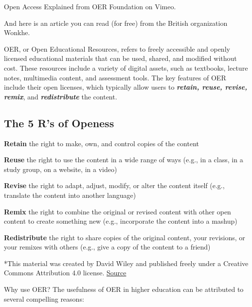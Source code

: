 \documentclass[
]{book}
\theoremstyle{definition}
\theoremstyle{definition}
\theoremstyle{definition}
\theoremstyle{definition}
\theoremstyle{remark}
\begin{document}
Open Access Explained from OER Foundation on Vimeo.

And here is an article you can read (for free) from the British organization Wonkhe.

OER, or Open Educational Resources, refers to freely accessible and openly licensed educational materials that can be used, shared, and modified without cost. These resources include a variety of digital assets, such as textbooks, lecture notes, multimedia content, and assessment tools. The key features of OER include their open licenses, which typically allow users to \textbf{\emph{retain, reuse, revise, remix}}, and \textbf{\emph{redistribute}} the content.

\hypertarget{the-5-rs-of-openess}{%
\subsection*{The 5 R's of Openess}\label{the-5-rs-of-openess}}

\textbf{Retain}
the right to make, own, and control copies of the content

\textbf{Reuse}
the right to use the content in a wide range of ways (e.g., in a class, in a study group, on a website, in a video)

\textbf{Revise}
the right to adapt, adjust, modify, or alter the content itself (e.g., translate the content into another language)

\textbf{Remix}
the right to combine the original or revised content with other open content to create something new (e.g., incorporate the content into a mashup)

\textbf{Redistribute}
the right to share copies of the original content, your revisions, or your remixes with others (e.g., give a copy of the content to a friend)

*This material was created by David Wiley and published freely under a Creative Commons Attribution 4.0 license. \href{http://opencontent.org/blog/archives/3221}{Source}

Why use OER? The usefulness of OER in higher education can be attributed to several compelling reasons:
\end{document}
